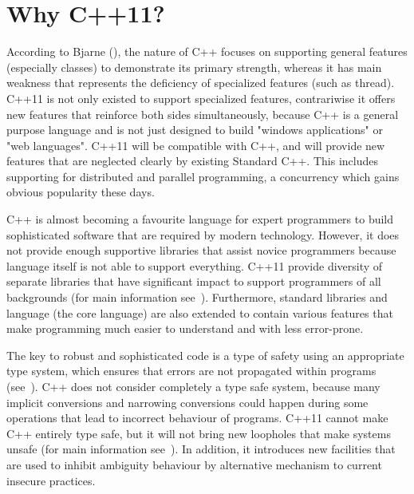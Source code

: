 \documentclass[11pt]{report}
\begin{document}
\section{Why C++11?}
\label{sec: why C++11}
According to Bjarne (\cite{Stroustrup:2005:Cpp}), the nature of C++ focuses on supporting general features (especially classes) to demonstrate its primary strength, whereas it has main weakness that represents the deficiency of specialized features (such as thread). C++11 is not  only existed to support specialized features, contrariwise it offers new features that reinforce both sides simultaneously, because C++ is a general purpose language and is not just designed to build "windows applications" or "web languages". C++11 will be compatible with C++, and will provide new features that are neglected clearly by existing Standard C++. This includes supporting for distributed and parallel programming, a concurrency which gains obvious popularity these days.

C++ is almost becoming a favourite language for expert programmers to build sophisticated software that are required by modern technology. However, it does not provide enough supportive libraries that assist novice programmers because language itself is not able to support everything. C++11 provide diversity of separate libraries that have significant impact to support programmers of all backgrounds (for main information see~\cite{Stroustrup:2005:Design}). Furthermore, standard libraries and language (the core language) are also extended to contain various features that make programming much easier to understand and with less error-prone.

The key to robust and sophisticated code is a type of safety using an appropriate type system, which ensures that errors are not propagated within programs (see~\cite{Stroustrup:2005:Cpp}). C++ does not consider completely a type safe system, because many implicit conversions and narrowing conversions could happen during some operations that lead to incorrect behaviour of programs. C++11 cannot make C++ entirely type safe, but it will not bring new loopholes that make systems unsafe (for main information see~\cite{Stroustrup:2005:Cpp}). In addition, it introduces new facilities that are used to inhibit ambiguity behaviour by alternative mechanism to current insecure practices.
\end{document}
